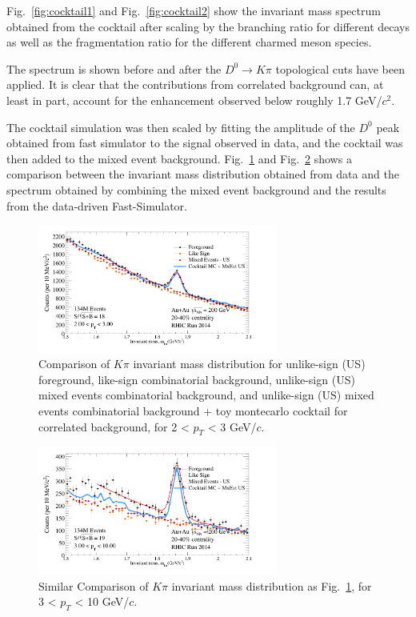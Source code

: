 Fig.~\ref{fig:cocktail1} and Fig.~\ref{fig:cocktail2} show the invariant mass spectrum obtained from the cocktail after scaling by the branching ratio for different decays as well as the fragmentation ratio for the different charmed meson species.

The spectrum is shown before and after the $D^0\rightarrow K\pi$ topological cuts have been applied. It is clear that the contributions from correlated background can, at least in part, account for the enhancement observed below roughly 1.7 GeV/$c^2$.

The cocktail simulation was then scaled by fitting the amplitude of the $D^0$ peak obtained from fast simulator to the signal observed in data, and the cocktail was then added to the mixed event background. Fig.~\ref{fig:bump1} and Fig.~\ref{fig:bump2} shows a comparison between the invariant mass distribution obtained from data and the spectrum obtained by combining the mixed event background and the results from the data-driven Fast-Simulator.

\begin{figure}[htbp]
\centering
\includegraphics[keepaspectratio,width=0.7\textwidth]{figure/Run14_D0HFT/D0_FG_EvMxBg_coktail_2040_2_pT_3.png}
\caption{Comparison of $K\pi$ invariant mass distribution for unlike-sign (US) foreground, like-sign combinatorial background, unlike-sign (US) mixed events combinatorial background, and unlike-sign (US) mixed events combinatorial background + toy montecarlo cocktail for correlated background, for 2 < $p_T$ < 3 GeV/$c$.}
\label{fig:bump1}
\end{figure}

\begin{figure}[htbp]
\centering
\includegraphics[keepaspectratio,width=0.7\textwidth]{figure/Run14_D0HFT/D0_FG_EvMcBg_cocktail_2040_3_pT_10.png}
\caption{Similar Comparison of $K\pi$ invariant mass distribution as Fig.~\ref{fig:bump1}, for 3 < $p_T$ < 10 GeV/$c$.}
\label{fig:bump2}
\end{figure}

